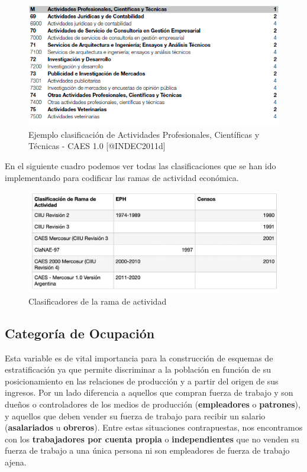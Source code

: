 \documentclass[
]{book}
\begin{document}
\begin{figure}

{\centering \includegraphics[width=0.8\linewidth]{imagenes/caes10} 

}

\caption{Ejemplo clasificación de Actividades Profesionales, Científicas y Técnicas - CAES 1.0 [@INDEC2011d]}\label{fig:unnamed-chunk-36}
\end{figure}

En el siguiente cuadro podemos ver todas las clasificaciones que se han ido implementando para codificar las ramas de actividad económica.

\begin{figure}

{\centering \includegraphics[width=0.8\linewidth]{imagenes/t4_u4} 

}

\caption{Clasificadores de la rama de actividad}\label{fig:unnamed-chunk-37}
\end{figure}

\hypertarget{categoruxeda-de-ocupaciuxf3n}{%
\subsection{Categoría de Ocupación}\label{categoruxeda-de-ocupaciuxf3n}}

Esta variable es de vital importancia para la construcción de esquemas de estratificación ya que permite discriminar a la población en función de su posicionamiento en las relaciones de producción y a partir del origen de sus ingresos. Por un lado diferencia a aquellos que compran fuerza de trabajo y son dueños o controladores de los medios de producción (\textbf{empleadores} o \textbf{patrones}), y aquellos que deben vender su fuerza de trabajo para recibir un salario (\textbf{asalariados} u \textbf{obreros}). Entre estas situaciones contrapuestas, nos encontramos con los \textbf{trabajadores por cuenta propia} o \textbf{independientes} que no venden su fuerza de trabajo a una única persona ni son empleadores de fuerza de trabajo ajena.
\end{document}
